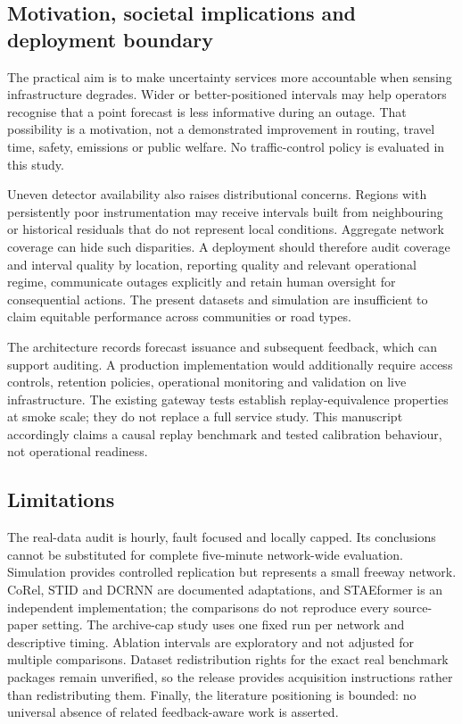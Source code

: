 \documentclass[pdflatex,sn-mathphys-num]{sn-jnl}
\begin{document}
\subsection{Motivation, societal implications and deployment boundary}
The practical aim is to make uncertainty services more accountable when sensing infrastructure degrades. Wider or better-positioned intervals may help operators recognise that a point forecast is less informative during an outage. That possibility is a motivation, not a demonstrated improvement in routing, travel time, safety, emissions or public welfare. No traffic-control policy is evaluated in this study.

Uneven detector availability also raises distributional concerns. Regions with persistently poor instrumentation may receive intervals built from neighbouring or historical residuals that do not represent local conditions. Aggregate network coverage can hide such disparities. A deployment should therefore audit coverage and interval quality by location, reporting quality and relevant operational regime, communicate outages explicitly and retain human oversight for consequential actions. The present datasets and simulation are insufficient to claim equitable performance across communities or road types.

The architecture records forecast issuance and subsequent feedback, which can support auditing. A production implementation would additionally require access controls, retention policies, operational monitoring and validation on live infrastructure. The existing gateway tests establish replay-equivalence properties at smoke scale; they do not replace a full service study. This manuscript accordingly claims a causal replay benchmark and tested calibration behaviour, not operational readiness.

\subsection{Limitations}
The real-data audit is hourly, fault focused and locally capped. Its conclusions cannot be substituted for complete five-minute network-wide evaluation. Simulation provides controlled replication but represents a small freeway network. CoRel, STID and DCRNN are documented adaptations, and STAEformer is an independent implementation; the comparisons do not reproduce every source-paper setting. The archive-cap study uses one fixed run per network and descriptive timing. Ablation intervals are exploratory and not adjusted for multiple comparisons. Dataset redistribution rights for the exact real benchmark packages remain unverified, so the release provides acquisition instructions rather than redistributing them. Finally, the literature positioning is bounded: no universal absence of related feedback-aware work is asserted.
\end{document}
